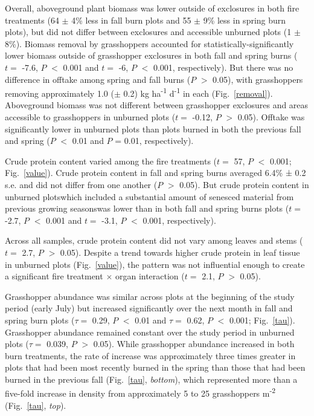 \documentclass[referee, 
	            sn-basic]
           {sn-jnl}
\begin{document}
Overall, aboveground plant biomass was lower outside of exclosures in both fire treatments (64 $\pm$ 4\% less in fall burn plots and 55 $\pm$ 9\% less in spring burn plots), but did not differ between exclosures and accessible unburned plots (1 $\pm$ 8\%).
Biomass removal by grasshoppers accounted for statistically-significantly lower biomass outside of grasshopper exclosures in both fall and spring burns (\(t =\) -7.6,
\(P\) $<$ 0.001 and \(t =\) -6, \(P\) $<$ 0.001, respectively).
But there was no difference in offtake among spring and fall burns (\(P\) $>$ 0.05), with grasshoppers removing approximately 1.0 ($\pm$ 0.2) kg ha\textsuperscript{-1} d\textsuperscript{-1} in each (Fig.~\ref{removal}). 
Aboveground biomass was not different between grasshopper exclosures and areas accessible to grasshoppers in unburned plots (\(t =\) -0.12, \(P\) $>$ 0.05).
 Offtake was significantly lower in unburned plots than plots burned in both the previous fall and spring (\(P\) $<$ 0.01 and \(P\) = 0.01, respectively).

Crude protein content varied among the fire treatments (\(t =\) 57, \(P\) $<$ 0.001; Fig.~\ref{value}). 
Crude protein content in fall and spring burns averaged 6.4\% ± 0.2 s.e. and did not differ from one another (\(P\) $>$ 0.05). 
But crude protein content in unburned plots\textemdash which included a substantial amount of senesced material from previous growing seasons\textemdash was lower than in both fall and spring burns plots (\(t =\) -2.7, \(P\) $<$ 0.001 and \(t =\) -3.1, \(P\) $<$ 0.001, respectively).

Across all samples, crude protein content did not vary among leaves and stems (\(t =\) 2.7, \(P\) $>$ 0.05). 
Despite a trend towards higher crude protein in leaf tissue in unburned plots (Fig.~\ref{value}), the pattern was not influential enough to create a significant fire
treatment \(\times\) organ interaction (\(t =\) 2.1, \(P\) $>$ 0.05).

Grasshopper abundance was similar across plots at the beginning of the study period (early July) but increased significantly over the next month in fall and spring burn plots (\(\tau =\) 0.29, \(P\) $<$ 0.01 and \(\tau =\) 0.62, \(P\) $<$ 0.001; Fig.~\ref{tau}). 
Grasshopper abundance remained constant over the study period in unburned plots (\(\tau =\) 0.039, \(P\) $>$ 0.05). 
While grasshopper abundance increased in both burn treatments, the rate of increase was approximately three times greater in plots that had been most recently burned in the spring than those that had been burned in the previous fall (Fig.~\ref{tau}, \emph{bottom}), which represented more than a five-fold increase in density from approximately 5 to 25 grasshoppers m\textsuperscript{-2} (Fig.~\ref{tau}, \emph{top}).
\end{document}
